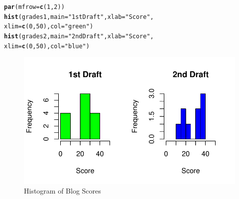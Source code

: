 \documentclass{article}\usepackage[]{graphicx}\usepackage[]{color}
\makeatletter
\def\maxwidth{ %
  \ifdim\Gin@nat@width>\linewidth
    \linewidth
  \else
    \Gin@nat@width
  \fi
}
\newcommand{\hlnum}[1]{\textcolor[rgb]{0.686,0.059,0.569}{#1}}%
\newcommand{\hlstr}[1]{\textcolor[rgb]{0.192,0.494,0.8}{#1}}%
\newcommand{\hlstd}[1]{\textcolor[rgb]{0.345,0.345,0.345}{#1}}%
\newcommand{\hlkwc}[1]{\textcolor[rgb]{0.333,0.667,0.333}{#1}}%
\newcommand{\hlkwd}[1]{\textcolor[rgb]{0.737,0.353,0.396}{\textbf{#1}}}%
\newenvironment{kframe}{%
 \def\at@end@of@kframe{}%
 \ifinner\ifhmode%
  \def\at@end@of@kframe{\end{minipage}}%
  \begin{minipage}{\columnwidth}%
 \fi\fi%
 \def\FrameCommand##1{\hskip\@totalleftmargin \hskip-\fboxsep
 \colorbox{shadecolor}{##1}\hskip-\fboxsep
     \hskip-\linewidth \hskip-\@totalleftmargin \hskip\columnwidth}%
 \MakeFramed {\advance\hsize-\width
   \@totalleftmargin\z@ \linewidth\hsize
   \@setminipage}}%
 {\par\unskip\endMakeFramed%
 \at@end@of@kframe}
\newenvironment{knitrout}{}{} %
\makeatother
\begin{document}
\bigskip
\begin{knitrout}
\color{fgcolor}\begin{kframe}
\begin{alltt}
\hlkwd{par}\hlstd{(}\hlkwc{mfrow}\hlstd{=}\hlkwd{c}\hlstd{(}\hlnum{1}\hlstd{,}\hlnum{2}\hlstd{))}
\hlkwd{hist}\hlstd{(grades1,} \hlkwc{main}\hlstd{=}\hlstr{"1st Draft"}\hlstd{,} \hlkwc{xlab}\hlstd{=}\hlstr{"Score"}\hlstd{,}
     \hlkwc{xlim}\hlstd{=}\hlkwd{c}\hlstd{(}\hlnum{0}\hlstd{,}\hlnum{50}\hlstd{),} \hlkwc{col}\hlstd{=}\hlstr{"green"}\hlstd{)}
\hlkwd{hist}\hlstd{(grades2,} \hlkwc{main}\hlstd{=}\hlstr{"2nd Draft"}\hlstd{,} \hlkwc{xlab}\hlstd{=}\hlstr{"Score"}\hlstd{,}
     \hlkwc{xlim}\hlstd{=}\hlkwd{c}\hlstd{(}\hlnum{0}\hlstd{,}\hlnum{50}\hlstd{),} \hlkwc{col}\hlstd{=}\hlstr{"blue"}\hlstd{)}
\end{alltt}
\end{kframe}\begin{figure}
\includegraphics[width=\maxwidth]{figure/unnamed-chunk-13-1} \caption[Histogram of Blog Scores]{Histogram of Blog Scores}\label{fig:unnamed-chunk-13}
\end{figure}


\end{knitrout}
\end{document}
